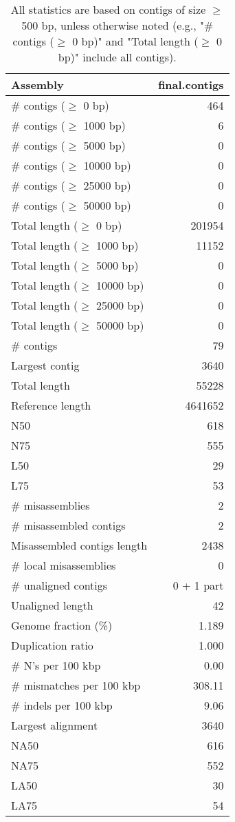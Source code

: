 \documentclass[12pt,a4paper]{article}
\begin{document}
\begin{table}[ht]
\begin{center}
\caption{All statistics are based on contigs of size $\geq$ 500 bp, unless otherwise noted (e.g., "\# contigs ($\geq$ 0 bp)" and "Total length ($\geq$ 0 bp)" include all contigs).}
\begin{tabular}{|l*{1}{|r}|}
\hline
Assembly & final.contigs \\ \hline
\# contigs ($\geq$ 0 bp) & 464 \\ \hline
\# contigs ($\geq$ 1000 bp) & 6 \\ \hline
\# contigs ($\geq$ 5000 bp) & 0 \\ \hline
\# contigs ($\geq$ 10000 bp) & 0 \\ \hline
\# contigs ($\geq$ 25000 bp) & 0 \\ \hline
\# contigs ($\geq$ 50000 bp) & 0 \\ \hline
Total length ($\geq$ 0 bp) & 201954 \\ \hline
Total length ($\geq$ 1000 bp) & 11152 \\ \hline
Total length ($\geq$ 5000 bp) & 0 \\ \hline
Total length ($\geq$ 10000 bp) & 0 \\ \hline
Total length ($\geq$ 25000 bp) & 0 \\ \hline
Total length ($\geq$ 50000 bp) & 0 \\ \hline
\# contigs & 79 \\ \hline
Largest contig & 3640 \\ \hline
Total length & 55228 \\ \hline
Reference length & 4641652 \\ \hline
N50 & 618 \\ \hline
N75 & 555 \\ \hline
L50 & 29 \\ \hline
L75 & 53 \\ \hline
\# misassemblies & 2 \\ \hline
\# misassembled contigs & 2 \\ \hline
Misassembled contigs length & 2438 \\ \hline
\# local misassemblies & 0 \\ \hline
\# unaligned contigs & 0 + 1 part \\ \hline
Unaligned length & 42 \\ \hline
Genome fraction (\%) & 1.189 \\ \hline
Duplication ratio & 1.000 \\ \hline
\# N's per 100 kbp & 0.00 \\ \hline
\# mismatches per 100 kbp & 308.11 \\ \hline
\# indels per 100 kbp & 9.06 \\ \hline
Largest alignment & 3640 \\ \hline
NA50 & 616 \\ \hline
NA75 & 552 \\ \hline
LA50 & 30 \\ \hline
LA75 & 54 \\ \hline
\end{tabular}
\end{center}
\end{table}
\end{document}
